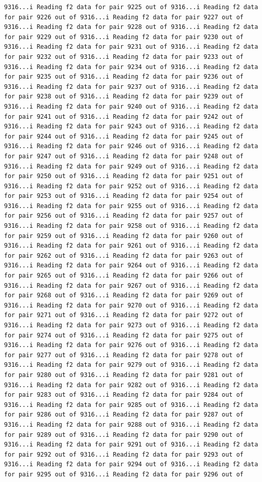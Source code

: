 \documentclass[
]{article}
\begin{document}
\begin{verbatim}
9316...i Reading f2 data for pair 9225 out of 9316...i Reading f2 data for pair 9226 out of 9316...i Reading f2 data for pair 9227 out of 9316...i Reading f2 data for pair 9228 out of 9316...i Reading f2 data for pair 9229 out of 9316...i Reading f2 data for pair 9230 out of 9316...i Reading f2 data for pair 9231 out of 9316...i Reading f2 data for pair 9232 out of 9316...i Reading f2 data for pair 9233 out of 9316...i Reading f2 data for pair 9234 out of 9316...i Reading f2 data for pair 9235 out of 9316...i Reading f2 data for pair 9236 out of 9316...i Reading f2 data for pair 9237 out of 9316...i Reading f2 data for pair 9238 out of 9316...i Reading f2 data for pair 9239 out of 9316...i Reading f2 data for pair 9240 out of 9316...i Reading f2 data for pair 9241 out of 9316...i Reading f2 data for pair 9242 out of 9316...i Reading f2 data for pair 9243 out of 9316...i Reading f2 data for pair 9244 out of 9316...i Reading f2 data for pair 9245 out of 9316...i Reading f2 data for pair 9246 out of 9316...i Reading f2 data for pair 9247 out of 9316...i Reading f2 data for pair 9248 out of 9316...i Reading f2 data for pair 9249 out of 9316...i Reading f2 data for pair 9250 out of 9316...i Reading f2 data for pair 9251 out of 9316...i Reading f2 data for pair 9252 out of 9316...i Reading f2 data for pair 9253 out of 9316...i Reading f2 data for pair 9254 out of 9316...i Reading f2 data for pair 9255 out of 9316...i Reading f2 data for pair 9256 out of 9316...i Reading f2 data for pair 9257 out of 9316...i Reading f2 data for pair 9258 out of 9316...i Reading f2 data for pair 9259 out of 9316...i Reading f2 data for pair 9260 out of 9316...i Reading f2 data for pair 9261 out of 9316...i Reading f2 data for pair 9262 out of 9316...i Reading f2 data for pair 9263 out of 9316...i Reading f2 data for pair 9264 out of 9316...i Reading f2 data for pair 9265 out of 9316...i Reading f2 data for pair 9266 out of 9316...i Reading f2 data for pair 9267 out of 9316...i Reading f2 data for pair 9268 out of 9316...i Reading f2 data for pair 9269 out of 9316...i Reading f2 data for pair 9270 out of 9316...i Reading f2 data for pair 9271 out of 9316...i Reading f2 data for pair 9272 out of 9316...i Reading f2 data for pair 9273 out of 9316...i Reading f2 data for pair 9274 out of 9316...i Reading f2 data for pair 9275 out of 9316...i Reading f2 data for pair 9276 out of 9316...i Reading f2 data for pair 9277 out of 9316...i Reading f2 data for pair 9278 out of 9316...i Reading f2 data for pair 9279 out of 9316...i Reading f2 data for pair 9280 out of 9316...i Reading f2 data for pair 9281 out of 9316...i Reading f2 data for pair 9282 out of 9316...i Reading f2 data for pair 9283 out of 9316...i Reading f2 data for pair 9284 out of 9316...i Reading f2 data for pair 9285 out of 9316...i Reading f2 data for pair 9286 out of 9316...i Reading f2 data for pair 9287 out of 9316...i Reading f2 data for pair 9288 out of 9316...i Reading f2 data for pair 9289 out of 9316...i Reading f2 data for pair 9290 out of 9316...i Reading f2 data for pair 9291 out of 9316...i Reading f2 data for pair 9292 out of 9316...i Reading f2 data for pair 9293 out of 9316...i Reading f2 data for pair 9294 out of 9316...i Reading f2 data for pair 9295 out of 9316...i Reading f2 data for pair 9296 out of 
\end{verbatim}
\end{document}
